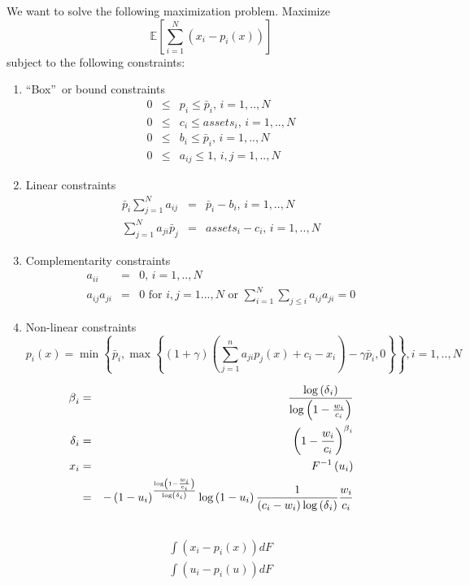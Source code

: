 \documentclass{article}
\begin{document}
We want to solve the following maximization problem. Maximize\ 
\[
\mathbb{E}\left[ \sum_{i=1}^{N}\left( x_{i}-p_{i}\left( x\right) \right) %
\right] 
\]%
subject to the following constraints:

\begin{enumerate}
\item \textquotedblleft Box\textquotedblright\ or bound constraints%
\begin{eqnarray*}
0 &\leq &p_{i}\leq \bar{p}_{i}\text{, }i=1,..,N \\
0 &\leq &c_{i}\leq assets_{i}\text{, }i=1,..,N \\
0 &\leq &b_{i}\leq \bar{p}_{i}\text{, }i=1,..,N \\
0 &\leq &a_{ij}\leq 1\text{, }i,j=1,..,N
\end{eqnarray*}

\item Linear constraints%
\begin{eqnarray*}
\bar{p}_{i}\sum_{j=1}^{N}a_{ij} &=&\bar{p}_{i}-b_{i}\text{, }i=1,..,N \\
\sum_{j=1}^{N}a_{ji}\bar{p}_{j} &=&assets_{i}-c_{i}\text{, }i=1,..,N
\end{eqnarray*}

\item Complementarity constraints%
\begin{eqnarray*}
a_{ii} &=&0\text{, }i=1,..,N \\
a_{ij}a_{ji} &=&0\text{ for }i,j=1...,N\text{ or }\sum_{i=1}^{N}\sum_{j\leq
i}a_{ij}a_{ji}=0
\end{eqnarray*}

\item Non-linear constraints%
\[
p_{i}\left( x\right) =\min \left\{ \bar{p}_{i},\max \left\{ \left( 1+\gamma
\right) \left( \sum_{j=1}^{n}a_{ji}p_{j}\left( x\right) +c_{i}-x_{i}\right)
-\gamma \bar{p}_{i},0\right\} \right\} ,i=1,..,N 
\]
\end{enumerate}

\begin{eqnarray*}
\beta _{i} &=&\frac{\log \left( \delta _{i}\right) }{\log \left( 1-\frac{%
w_{i}}{c_{i}}\right) } \\
\delta _{i} &=&\left( 1-\frac{w_{i}}{c_{i}}\right) ^{\beta _{i}} \\
x_{i} &=&F^{-1}\left( u_{i}\right) \\
&=&-\left( 1-u_{i}\right) ^{\frac{\log \left( 1-\frac{w_{i}}{c_{i}}\right) }{%
\log \left( \delta _{i}\right) }}\log \left( 1-u_{i}\right) \frac{1}{\left(
c_{i}-w_{i}\right) \log \left( \delta _{i}\right) }\frac{w_{i}}{c_{i}} \\
&&
\end{eqnarray*}%
\begin{eqnarray*}
&&\int \left( x_{i}-p_{i}\left( x\right) \right) dF \\
&&\int \left( u_{i}-p_{i}\left( u\right) \right) dF
\end{eqnarray*}
\end{document}
